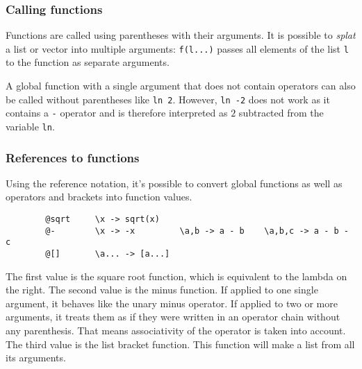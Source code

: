 \documentclass[10pt]{article}
\begin{document}
    \subsubsection{Calling functions}
    Functions are called using parentheses with their arguments.
    It is possible to \textsl{splat} a list or vector into multiple arguments:
    \verb|f(l...)| passes all elements of the list \verb|l| to the function as separate arguments.
    
    A global function with a single argument that does not contain operators can also be called without parentheses like \verb|ln 2|.
    However, \verb|ln -2| does not work as it contains a \verb|-| operator and is therefore interpreted as $ 2 $ subtracted from the variable \verb|ln|.

    \subsubsection{References to functions}
    Using the reference notation, it's possible to convert global functions as well as operators and brackets into function values.
    \begin{verbatim}
        @sqrt     \x -> sqrt(x)
        @-        \x -> -x         \a,b -> a - b    \a,b,c -> a - b - c
        @[]       \a... -> [a...]
    \end{verbatim}
    The first value is the square root function, which is equivalent to the lambda on the right.
    The second value is the minus function.
    If applied to one single argument, it behaves like the unary minus operator.
    If applied to two or more arguments, it treats them as if they were written in an operator chain without any parenthesis.
    That means associativity of the operator is taken into account.
    The third value is the list bracket function.
    This function will make a list from all its arguments.
    
\end{document}
